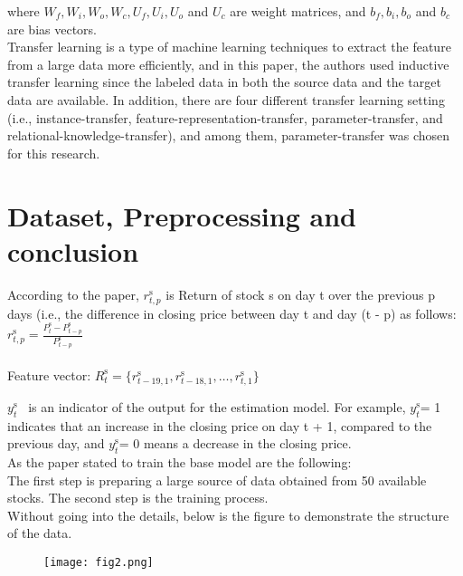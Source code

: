 \documentclass[11pt, oneside]{article}
\begin{document}
\begin{Large}
where $W_f,W_i,W_o,W_c,U_f,U_i,U_o$ and $U_c$ are weight matrices, and $b_f,b_i,b_o$ and $b_c$ are bias vectors.\\
%
Transfer learning is a type of machine learning techniques to extract the feature from a large data more efficiently, and in this paper, the authors used inductive transfer learning since the labeled data in both the source data and the target data are available.  In addition, there are four different transfer learning setting (i.e., instance-transfer, feature-representation-transfer, parameter-transfer, and relational-knowledge-transfer), and among them, parameter-transfer was chosen for this research.\\

\section{Dataset, Preprocessing and conclusion}

According to the paper, $r^{\mathrm{s}}_{t,p}$ is Return of stock s on day t over the previous p days (i.e., the difference in closing price between day t and day (t - p) as follows:\\

\hspace{30pt}$r^{\mathrm{s}}_{t,p}=\frac{P^{\mathrm{s}}_{t} - P^{\mathrm{s}}_{t-p}}{ P^{\mathrm{s}}_{t-p}}$\\
%
\\Feature vector: $R^{\mathrm{s}}_{t}=\{r^{\mathrm{s}}_{t-19,1}, r^{\mathrm{s}}_{t-18,1},\ldots, r^{\mathrm{s}}_{t,1}\}$

$y^{\mathrm{s}}_{t} $ \ is an indicator of the output for the estimation model.  For example,
$y^{\mathrm{s}}_{t} $= 1 indicates that an increase in the closing price on day t + 1, compared to the previous day, and $y^{\mathrm{s}}_{t}$= 0 means a decrease in the closing price.\\
%
As the paper stated to train the base model are the following: \\

The first step is preparing a large source of data obtained from 50 available stocks. 
The second step is the training process. \\ Without going into the details, below is the figure to demonstrate the structure of the data.

\begin{figure}[h!]
  \texttt{[image: fig2.png]}
\end{figure}


\end{Large}
\end{document}
